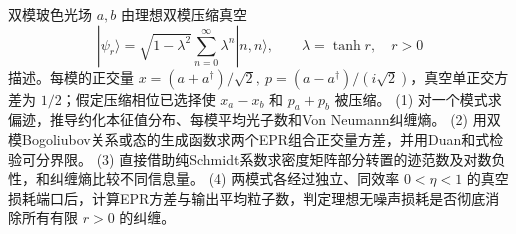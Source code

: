 双模玻色光场 \(a,b\) 由理想双模压缩真空
\[
|\psi_r\rangle=\sqrt{1-\lambda^2}\sum_{n=0}^\infty\lambda^n|n,n\rangle,\qquad
\lambda=\tanh r,\quad r>0
\]
描述。每模的正交量 \(x=(a+a^\dagger)/\sqrt2,\ p=(a-a^\dagger)/(i\sqrt2)\)，真空单正交方差为 \(1/2\)；假定压缩相位已选择使 \(x_a-x_b\) 和 \(p_a+p_b\) 被压缩。
(1) 对一个模式求偏迹，推导约化本征值分布、每模平均光子数和Von Neumann纠缠熵。
(2) 用双模Bogoliubov关系或态的生成函数求两个EPR组合正交量方差，并用Duan和式检验可分界限。
(3) 直接借助纯Schmidt系数求密度矩阵部分转置的迹范数及对数负性，和纠缠熵比较不同信息量。
(4) 两模式各经过独立、同效率 \(0<\eta<1\) 的真空损耗端口后，计算EPR方差与输出平均粒子数，判定理想无噪声损耗是否彻底消除所有有限 \(r>0\) 的纠缠。
